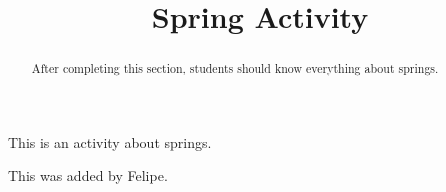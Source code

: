 \documentclass{ximera}
\title{Spring Activity}
\begin{document}
\begin{abstract}
After completing this section, students should know everything about springs.
\end{abstract}


\maketitle

This is an activity about springs.

This was added by Felipe.
\end{document}
